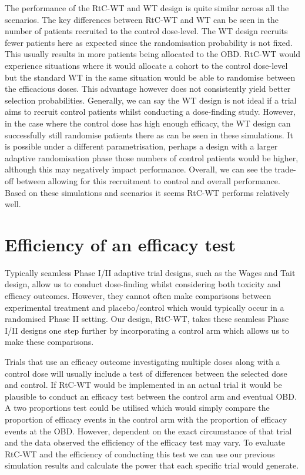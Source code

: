 The performance of the RtC-WT and WT design is quite similar across all the scenarios. The key differences between RtC-WT and WT can be seen in the number of patients recruited to the control dose-level. The WT design recruits fewer patients here as expected since the randomisation probability is not fixed. This usually results in more patients being allocated to the OBD. RtC-WT would experience situations where it would allocate a cohort to the control dose-level but the standard WT in the same situation would be able to randomise between the efficacious doses. This advantage however does not consistently yield better selection probabilities. Generally, we can say the WT design is not ideal if a trial aims to recruit control patients whilst conducting a dose-finding study. However, in the case where the control dose has high enough efficacy, the WT design can successfully still randomise patients there as can be seen in these simulations. It is possible under a different parametrisation, perhaps a design with a larger adaptive randomisation phase those numbers of control patients would be higher, although this may negatively impact performance. Overall, we can see the trade-off between allowing for this recruitment to control and overall performance. Based on these simulations and scenarios it seems RtC-WT performs relatively well.



\section{Efficiency of an efficacy test}
\label{WT:Efficiency-Efficacy-Test}

Typically seamless Phase \RN{1}/\RN{2} adaptive trial designs, such as the Wages and Tait design, allow us to conduct dose-finding whilst considering both toxicity and efficacy outcomes. However, they cannot often make comparisons between experimental treatment and placebo/control which would typically occur in a randomised Phase \RN{2} setting. Our design, RtC-WT, takes these seamless Phase \RN{1}/\RN{2} designs one step further by incorporating a control arm which allows us to make these comparisons. 

Trials that use an efficacy outcome investigating multiple doses along with a control dose will usually include a test of differences between the selected dose and control. If RtC-WT would be implemented in an actual trial it would be plausible to conduct an efficacy test between the control arm and eventual OBD. A two proportions test \cite{patnaikPowerFunctionTest1948} could be utilised which would simply compare the proportion of efficacy events in the control arm with the proportion of efficacy events at the OBD. However, dependent on the exact circumstance of that trial and the data observed the efficiency of the efficacy test may vary. To evaluate RtC-WT and the efficiency of conducting this test we can use our previous simulation results and calculate the power that each specific trial would generate.  

